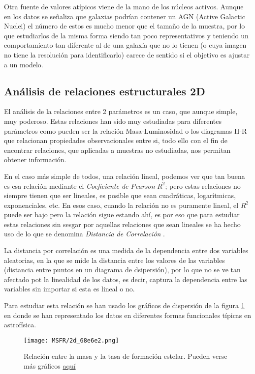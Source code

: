 \documentclass[11pt, a4paper]{article} %
\begin{document}
Otra fuente de valores atípicos viene de la mano de los núcleos activos. Aunque en los datos se señaliza que galaxias podrían contener un AGN (Active Galactic Nuclei) el número de estos es mucho menor que el tamaño de la muestra, por lo que estudiarlos
de la misma forma siendo tan poco representativos y teniendo un comportamiento tan diferente al de una galaxía que no lo tienen (o cuya imagen no tiene la resolución para identificarlo) carece de sentido si el objetivo es ajustar a un modelo. 

\subsection{Análisis de relaciones estructurales 2D}

El análisis de la relaciones entre 2 parámetros es un caso, que aunque simple, muy poderoso. Estas relaciones han sido muy estudiadas para diferentes parámetros 
como pueden ser la relación Masa-Luminosidad o los diagramas H-R que relacionan propiedades observacionales entre si, todo ello con el fin de encontrar relaciones, que aplicadas a muestras no estudiadas, nos permitan obtener información. 

En el caso más simple de todos, una relación lineal, podemos ver que tan buena es esa relación mediante el \textit{ Coeficiente de Pearson} $R^2$; pero 
estas relaciones no siempre tienen que ser lineales, es posible que sean cuadráticas, logarítmicas, exponenciales, etc. En esos caso, cuando la relación no es puramente lineal, el $R^2$ puede ser bajo
pero la relación sigue estando ahí, es por eso que para estudiar estas relaciones sin sesgar por aquellas relaciones que sean lineales se ha hecho uso de lo que se denomina \textit{Distancia de Correlación} \autocite{dcor}.

La distancia por correlación es una medida de la dependencia entre dos variables aleatorias, en la que se mide la distancia entre los valores de las variables (distancia entre puntos en un diagrama de dsipersión), por lo que no se ve tan afectado pot la 
linealidad de los datos, es decir, captura la dependencia entre las variables sin importar si esta es lineal o no.

Para estudiar esta relación se han usado los gráficos de dispersión de la figura \ref{fig:MSFR} en donde se han representado los datos en diferentes formas funcionales típicas en astrofísica.

\begin{figure}[H]
    \centering
    \texttt{[image: MSFR/2d\_68e6e2.png]}
    \caption{Relación entre la masa y la tasa de formación estelar. Pueden verse más gráficos \href{https://github.com/PhyAMR/TFG/tree/main/MSFR}{aquí}}
    \label{fig:MSFR}
\end{figure}
\end{document}
